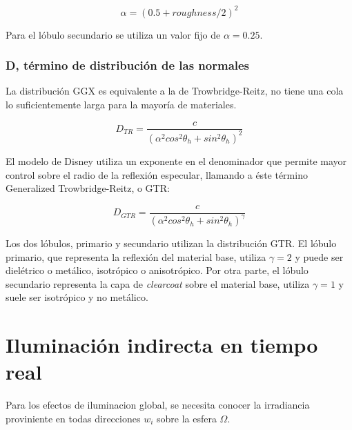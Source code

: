             \begin{equation}
            \alpha = (0.5 + roughness / 2)^2
            \end{equation}
            \singlespacing

            Para el l\'obulo secundario se utiliza un valor fijo de $\alpha = 0.25$.

        \subsubsection{D, t\'ermino de distribuci\'on de las normales}
            La distribuci\'on GGX es equivalente a la de Trowbridge-Reitz, no tiene una cola lo suficientemente larga para la
            mayor\'ia de materiales.

            \begin{equation}
                D_{TR} = \frac
                {c}
                {(\alpha^2 cos^2 \theta_h + sin^2 \theta_h)^2}
            \end{equation}
            \singlespacing

            El modelo de Disney utiliza un exponente en el denominador que permite mayor control sobre el radio de la reflexi\'on
            especular, llamando a \'este t\'ermino Generalized Trowbridge-Reitz, o GTR:

            \begin{equation}
                D_{GTR} = \frac
                {c}
                {(\alpha^2 cos^2 \theta_h + sin^2 \theta_h)^\gamma}
            \end{equation}
            \singlespacing


            Los dos l\'obulos, primario y secundario utilizan la distribuci\'on GTR. El l\'obulo primario,
            que representa la reflexi\'on del material base, utiliza $\gamma = 2$ y puede ser diel\'etrico o met\'alico,
            isotr\'opico o anisotr\'opico. Por otra parte, el l\'obulo secundario representa la capa de \textit{clearcoat}
            sobre el material base, utiliza $\gamma = 1$ y suele ser isotr\'opico y no met\'alico.




\section{Iluminaci\'on indirecta en tiempo real}

Para los efectos de iluminacion global, se necesita conocer la irradiancia proviniente en todas
direcciones $w_i$ sobre la esfera $\Omega$.\\

